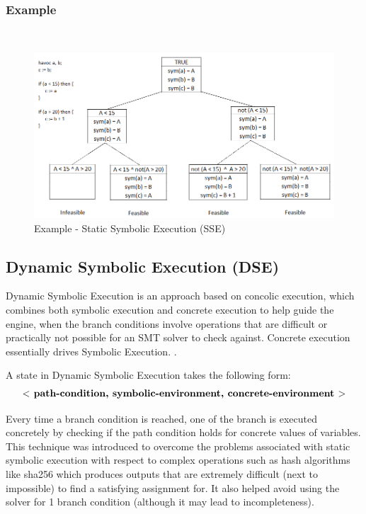 \documentclass[11pt]{llncs}
\begin{document}
		\subsubsection{Example}
			~
			\begin{figure}[H]
				\includegraphics[width=1\textwidth]{SSE_Example.png}
				\caption{Example - Static Symbolic Execution (SSE)} \label{fig_1}
			\end{figure}

		





	\subsection{Dynamic Symbolic Execution (DSE)}
		Dynamic Symbolic Execution is an approach based on concolic execution, which combines both symbolic execution and concrete execution to help guide the engine, when the branch conditions involve operations that are difficult or practically not possible for an SMT solver to check against. Concrete execution essentially drives Symbolic Execution. \cite{2_Survey_SE}.
		
		\vspace{2mm}

		A state in Dynamic Symbolic Execution takes the following form:
		\vspace{-4mm}
		\begin{equation}
			\textbf{$ < $ path-condition, symbolic-environment, concrete-environment $ > $}
		\end{equation}

		Every time a branch condition is reached, one of the branch is executed concretely by checking if the path condition holds for concrete values of variables. This technique was introduced to overcome the problems associated with static symbolic execution with respect to complex operations such as hash algorithms like sha256 which produces outputs that are extremely difficult (next to impossible) to find a satisfying assignment for. It also helped avoid using the solver for 1 branch condition (although it may lead to incompleteness).
		
\end{document}
